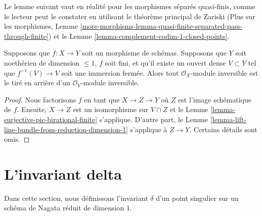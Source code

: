 \noindent
Le lemme suivant vaut en réalité pour les morphismes séparés
quasi-finis, comme le lecteur peut le constater en utilisant le
théorème principal de Zariski (Plus sur les morphismes, Lemme
\ref{more-morphisms-lemma-quasi-finite-separated-pass-through-finite})
et le Lemme \ref{lemma-complement-codim-1-closed-points}.

\begin{lemma}
\label{lemma-surjection-on-pic-quasi-finite}
Supposons que $f : X \to Y$ soit un morphisme de schémas. Supposons
que $Y$ soit noethérien de dimension $\leq 1$, $f$ soit fini, et
qu'il existe un ouvert dense $V \subset Y$ tel que $f^{-1}(V) \to V$
soit une immersion fermée. Alors tout $\mathcal{O}_X$-module
inversible est le tiré en arrière d'un $\mathcal{O}_Y$-module inversible.
\end{lemma}

\begin{proof}
Nous factorisons $f$ en tant que $X \to Z \to Y$ où $Z$
est l'image schématique de $f$. Ensuite, $X \to Z$ est un
isomorphisme sur $V \cap Z$ et le Lemme
\ref{lemma-surjective-pic-birational-finite} s'applique.
D'autre part, le Lemme
\ref{lemma-lift-line-bundle-from-reduction-dimension-1} s'applique à $Z \to Y$. Certains détails sont omis.
\end{proof}








\section{L'invariant delta}
\label{section-delta-invariant}

\noindent
Dans cette section, nous définissons l'invariant $\delta$ d'un
point singulier sur un schéma de Nagata réduit de dimension $1$.

